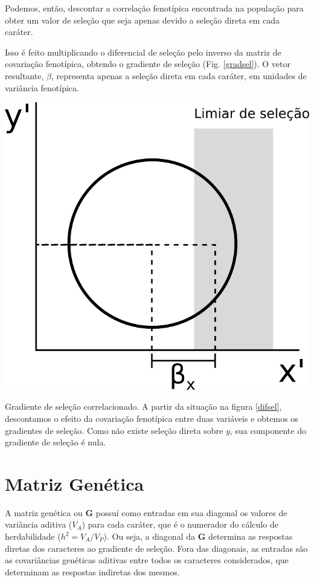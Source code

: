 \documentclass[portuges,]{tufte-handout}
\begin{document}
Podemos, então, descontar a correlação fenotípica encontrada na
população para obter um valor de seleção que seja apenas devido a
seleção direta em cada caráter.

Isso é feito multiplicando o diferencial de seleção pelo inverso da
matriz de covariação fenotípica, obtendo o gradiente de seleção (Fig.
\ref{gradsel}). O vetor resultante, $\beta$, representa apenas a seleção
direta em cada caráter, em unidades de variância fenotípica.

\begin{marginfigure}
\includegraphics{./figuras/gradientedeselecao.png}
\caption{Gradiente de seleção correlacionado. A partir da
situação na figura \ref{difsel}, descontamos o efeito da covariação
fenotípica entre duas variáveis e obtemos os gradientes de seleção. Como
não existe seleção direta sobre $y$, sua componente do gradiente de
seleção é nula.}
\label{gradsel}
\end{marginfigure}

\section{Matriz Genética}\label{matriz-genuxe9tica}

A matriz genética ou $\mathbf{G}$ possuí como entradas em sua diagonal
os valores de variância aditiva ($V_A$) para cada caráter, que é o
numerador do cálculo de herdabilidade ($h^2 = V_A/V_P$). Ou seja, a
diagonal da $\mathbf{G}$ determina as respostas diretas dos caracteres
ao gradiente de seleção. Fora das diagonais, as entradas são as
covariâncias genéticas aditivas entre todos os caracteres considerados,
que determinam as respostas indiretas dos mesmos.
\end{document}
